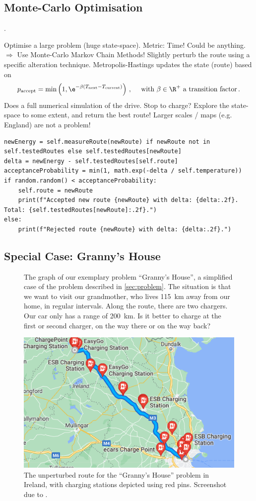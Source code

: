 \documentclass{prettytex/ox/mmsc-special-topic}
\begin{document}
  \subsection{Monte-Carlo Optimisation}
  \cite{metropolis, hastings}.

  Optimise a large problem (huge state-space). Metric: Time! Could be anything.
  $\Rightarrow$ Use Monte-Carlo Markov Chain Methods!
  Slightly perturb the route using a specific alteration technique.
  Metropolis-Hastings updates the state (route) based on $$p_{\rm accept} = \min\left(1, \e^{-\beta (T_{\rm next} - T_{\rm current})}\right)\,, \quad \text{ with } \beta \in \R^+ \text{ a transition factor} \,.$$
  Does a full numerical simulation of the drive. Stop to charge?
  Explore the state-space to some extent, and return the best route!
  Larger scales / maps (e.g. England) are not a problem!

  \begin{verbatim}
newEnergy = self.measureRoute(newRoute) if newRoute not in self.testedRoutes else self.testedRoutes[newRoute]
delta = newEnergy - self.testedRoutes[self.route]
acceptanceProbability = min(1, math.exp(-delta / self.temperature))
if random.random() < acceptanceProbability:
    self.route = newRoute
    print(f"Accepted new route {newRoute} with delta: {delta:.2f}. Total: {self.testedRoutes[newRoute]:.2f}.")
else:
    print(f"Rejected route {newRoute} with delta: {delta:.2f}.")
  \end{verbatim}

  \subsection{Special Case: Granny's House}
  \begin{figure}[H]
    \centering
    \caption{The graph of our exemplary problem ``Granny's House'', a simplified case of the problem described in \autoref{sec:problem}. The situation is that we want to visit our grandmother, who lives \SI{115}{\kilo\meter} away from our home, in regular intervals. Along the route, there are two chargers. Our car only has a range of \SI{200}{\kilo\meter}. Is it better to charge at the first or second charger, on the way there or on the way back?}
    \label{fig:grannys-idealised-problem-setting}
  \end{figure}

  \begin{figure}[H]
    \centering
    \includegraphics[width=0.5\linewidth]{figures/grannys-stations.png}
    \caption{The unperturbed route for the ``Granny's House'' problem in Ireland, with charging stations depicted using red pins. Screenshot due to \cite{googlemaps}.}
    \label{fig:grannys-stations}
  \end{figure}
\end{document}
